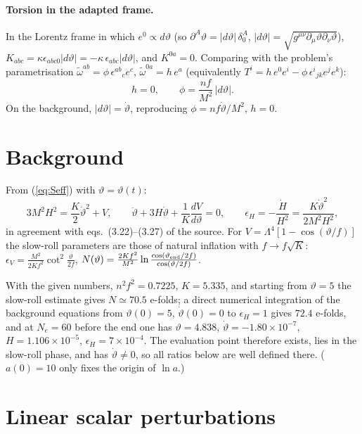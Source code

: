 \documentclass[11pt]{article}
\begin{document}
\paragraph{Torsion in the adapted frame.} In the Lorentz frame in which $e^0\propto d\vartheta$ (so $\partial^A\vartheta=|d\vartheta|\,\delta^A_0$, $|d\vartheta|=\sqrt{g^{\mu\nu}\partial_\mu\vartheta\partial_\nu\vartheta}$), $K_{abc}=\kappa\epsilon_{abc0}|d\vartheta|=-\kappa\,\epsilon_{abc}|d\vartheta|$, and $K^{0a}=0$. Comparing with the problem's parametrisation $\tilde\omega^{ab}=\phi\,\epsilon^{ab}{}_ce^c$, $\tilde\omega^{0a}=h\,e^a$ (equivalently $T^i=h\,e^0e^i-\phi\,\epsilon^i{}_{jk}e^je^k$):
\begin{equation}
h=0,\qquad \phi=\frac{nf}{M^2}\,|d\vartheta| .
\label{eq:phi}
\end{equation}
On the background, $|d\vartheta|=\dot\vartheta$, reproducing $\phi=nf\dot\vartheta/M^2$, $h=0$.

\section{Background}
From (\ref{eq:Seff}) with $\vartheta=\vartheta(t)$:
\begin{equation}
3M^2H^2=\frac K2\dot\vartheta^2+V,\qquad \ddot\vartheta+3H\dot\vartheta+\frac1K\frac{dV}{d\vartheta}=0,\qquad \epsilon_H=-\frac{\dot H}{H^2}=\frac{K\dot\vartheta^2}{2M^2H^2},
\end{equation}
in agreement with eqs.\ (3.22)--(3.27) of the source. For $V=\Lambda^4[1-\cos(\vartheta/f)]$ the slow-roll parameters are those of natural inflation with $f\to f\sqrt K$: $\epsilon_V=\frac{M^2}{2Kf^2}\cot^2\frac{\vartheta}{2f}$, $N(\vartheta)=\frac{2Kf^2}{M^2}\ln\frac{\cos(\vartheta_{\rm end}/2f)}{\cos(\vartheta/2f)}$.

With the given numbers, $n^2f^2=0.7225$, $K=5.335$, and starting from $\vartheta=5$ the slow-roll estimate gives $N\simeq70.5$ e-folds; a direct numerical integration of the background equations from $\vartheta(0)=5$, $\dot\vartheta(0)=0$ to $\epsilon_H=1$ gives $72.4$ e-folds, and at $N_e=60$ before the end one has $\vartheta=4.838$, $\dot\vartheta=-1.80\times10^{-7}$, $H=1.106\times10^{-5}$, $\epsilon_H=7\times10^{-4}$. The evaluation point therefore exists, lies in the slow-roll phase, and has $\dot\vartheta\neq0$, so all ratios below are well defined there. ($a(0)=10$ only fixes the origin of $\ln a$.)

\section{Linear scalar perturbations}
\end{document}
